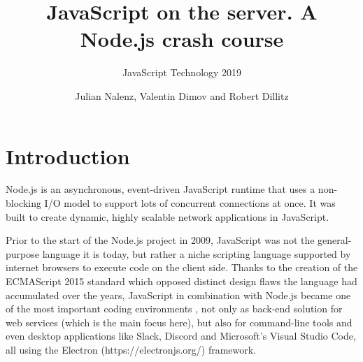 \documentclass{bioinfo}
\begin{document}

\subtitle{JavaScript Technology 2019}

\title[JavaScript on the server. A Node.js crash course]{JavaScript on the server. A Node.js crash course}
\author{Julian Nalenz, Valentin Dimov and Robert Dillitz}


\maketitle

\section{Introduction}

Node.js is an asynchronous, event-driven JavaScript runtime that uses a non-blocking I/O model to support lots of concurrent connections at once. It was built to create dynamic, highly scalable network applications in JavaScript. \cite{nodejsabout}

Prior to the start of the Node.js project in 2009, JavaScript was not the general-purpose language it is today, but rather a niche scripting language supported by internet browsers to execute code on the client side. Thanks to the creation of the ECMAScript 2015 standard which opposed distinct design flaws the language had accumulated over the years, JavaScript in combination with Node.js became one of the most important coding environments \cite{nodejswelcome}, not only as back-end solution for web services (which is the main focus here), but also for command-line tools and even desktop applications like Slack, Discord and Microsoft's Visual Studio Code, all using the Electron (https://electronjs.org/) framework. \cite{nodejsapplications}
\end{document}
